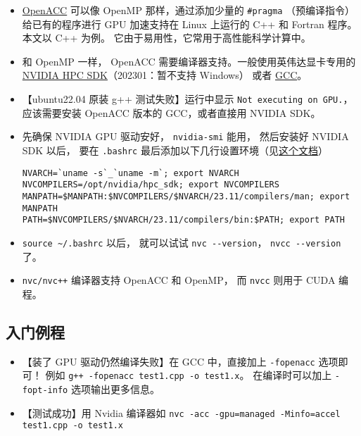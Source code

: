

\begin{itemize}
\item \href{https://www.openacc.org/}{OpenACC} 可以像 OpenMP 那样，通过添加少量的 \verb`#pragma` （预编译指令）给已有的程序进行 GPU 加速支持在 Linux 上运行的 C++ 和 Fortran 程序。本文以 C++ 为例。 它由于易用性，它常用于高性能科学计算中。
\item 和 OpenMP 一样， OpenACC 需要编译器支持。一般使用英伟达显卡专用的 \href{https://developer.nvidia.com/hpc-sdk}{NVIDIA HPC SDK}（202301：暂不支持 Windows） 或者 \href{https://www.openacc.org/tools/gcc-for-openacc}{GCC}。
\item 【ubuntu22.04 原装 g++ 测试失败】运行中显示 \verb`Not executing on GPU.`，应该需要安装 OpenACC 版本的 GCC，或者直接用 NVIDIA SDK。
\item 先确保 NVIDIA GPU 驱动安好， \verb`nvidia-smi` 能用， 然后安装好 NVIDIA SDK 以后， 要在 \verb`.bashrc` 最后添加以下几行设置环境（见\href{https://docs.nvidia.com/hpc-sdk//hpc-sdk-install-guide/index.html}{这个文档}）
\begin{lstlisting}[language=none]
NVARCH=`uname -s`_`uname -m`; export NVARCH
NVCOMPILERS=/opt/nvidia/hpc_sdk; export NVCOMPILERS
MANPATH=$MANPATH:$NVCOMPILERS/$NVARCH/23.11/compilers/man; export MANPATH
PATH=$NVCOMPILERS/$NVARCH/23.11/compilers/bin:$PATH; export PATH
\end{lstlisting}
\item \verb`source ~/.bashrc` 以后， 就可以试试 \verb`nvc --version`， \verb`nvcc --version` 了。
\item \verb`nvc/nvc++` 编译器支持 OpenACC 和 OpenMP， 而 \verb`nvcc` 则用于 CUDA 编程。
\end{itemize}

\subsection{入门例程}
\begin{itemize}
\item 【装了 GPU 驱动仍然编译失败】在 GCC 中，直接加上 \verb`-fopenacc` 选项即可！ 例如 \verb`g++ -fopenacc test1.cpp -o test1.x`。 在编译时可以加上 \verb`-fopt-info` 选项输出更多信息。
\item 【测试成功】用 Nvidia 编译器如 \verb`nvc -acc -gpu=managed -Minfo=accel test1.cpp -o test1.x`
\end{itemize}

